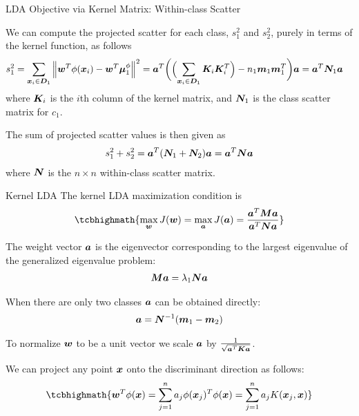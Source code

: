 \begin{frame}{LDA Objective via Kernel Matrix: Within-class Scatter}

We can compute the projected scatter for each class, $s_1^2$
and $s_2^2$, purely in terms of the kernel function, as follows
\begin{align*}
    s_1^2 & = \sum_{{\boldsymbol x}_i \in {\boldsymbol D}_1}
    \left\lVert{\boldsymbol w}^T\phi({\boldsymbol x}_i) - {\boldsymbol w}^T{\bm \mu}^\phi_1\right\rVert^2
    = {\boldsymbol a}^T \biggl(
    \Bigl(\sum_{{\boldsymbol x}_i \in {\boldsymbol D}_1} {\boldsymbol K}_i{\boldsymbol K}_i^T\Bigr)
    - n_1 {\boldsymbol m}_1 {\boldsymbol m}_1^T \biggr) {\boldsymbol a}
     = {\boldsymbol a}^T {\boldsymbol N}_1 {\boldsymbol a}
\end{align*}
where ${\boldsymbol K}_i$ is the $i$th column of the kernel matrix, and ${\boldsymbol N}_1$
is the class scatter matrix for $c_1$. 

\medskip
The sum of projected scatter values is then given as
\begin{align*}
  s_1^2 + s_2^2 = {\boldsymbol a}^T ({\boldsymbol N}_1 + {\boldsymbol N}_2) {\boldsymbol a} = {\boldsymbol a}^T {\boldsymbol N} {\boldsymbol a}
\end{align*}
where ${\boldsymbol N}$ is the $n\times n$ within-class scatter matrix.
\end{frame}

\begin{frame}{Kernel LDA}
The kernel LDA maximization condition is
\begin{align*}
\tcbhighmath{
    \max_{\bw} J(\bw) = \max_{\ba} J(\ba) =
    {\ba^T\bM\ba \over \ba^T\bN\ba}
}
\end{align*}


\medskip
The weight vector ${\boldsymbol a}$ is the eigenvector
corresponding to the largest eigenvalue of the generalized
eigenvalue problem:
\begin{align*}
    {\boldsymbol M}{\boldsymbol a} = \lambda_1{\boldsymbol N}{\boldsymbol a}
\end{align*}

\medskip
When there are only two classes ${\boldsymbol a}$ can be
obtained directly:
\begin{align*}
    {\boldsymbol a} = {\boldsymbol N}^{-1} ({\boldsymbol m}_1 - {\boldsymbol m}_2)
\end{align*}

\medskip
To normalize ${\boldsymbol w}$ to be a unit vector  we
scale ${\boldsymbol a}$ by $1 \over \sqrt{{\boldsymbol a}^T{\boldsymbol K}{\boldsymbol a}}$.


\medskip
We can project any point ${\boldsymbol x}$ onto the discriminant
direction as follows:
\begin{align*}
\tcbhighmath{
  \bw^T\phi(\bx) = \dsum_{j=1}^n a_{j}\phi(\bx_{j})^T\phi(\bx) =
  \dsum_{j=1}^n a_{j} K(\bx_{j},\bx)
}
\end{align*}
\end{frame}



